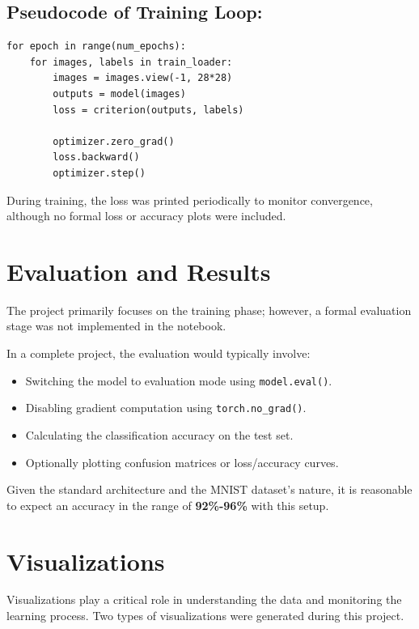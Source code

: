 \documentclass{article}
\begin{document}
\subsection*{Pseudocode of Training Loop:}
\begin{verbatim}
for epoch in range(num_epochs):
    for images, labels in train_loader:
        images = images.view(-1, 28*28)
        outputs = model(images)
        loss = criterion(outputs, labels)

        optimizer.zero_grad()
        loss.backward()
        optimizer.step()
\end{verbatim}

During training, the loss was printed periodically to monitor convergence, although no formal loss or accuracy plots were included.

\section{Evaluation and Results}
The project primarily focuses on the training phase; however, a formal evaluation stage was not implemented in the notebook.

In a complete project, the evaluation would typically involve:
\begin{itemize}
    \item Switching the model to evaluation mode using \texttt{model.eval()}.
    \item Disabling gradient computation using \texttt{torch.no\_grad()}.
    \item Calculating the classification accuracy on the test set.
    \item Optionally plotting confusion matrices or loss/accuracy curves.
\end{itemize}

Given the standard architecture and the MNIST dataset's nature, it is reasonable to expect an accuracy in the range of \textbf{92\%-96\%} with this setup.

\section{Visualizations}
Visualizations play a critical role in understanding the data and monitoring the learning process. Two types of visualizations were generated during this project.
\end{document}
